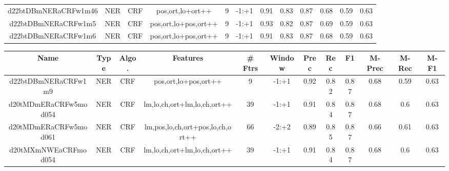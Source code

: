 \documentclass[a4paper]{article}
\begin{document}
\begin{landscape}
\begin{center}
\begin{tabular}{ |c|c|c|c|c|c|c|c|c|c|c|c|}
 
 	
 	\small{ d22btDBmNERaCRFw1m46 } & \small{ NER} & \small{  CRF }  & pos,ort,lo+ort++  &  9 &  \small{  -1:+1 }  &  0.91 & 0.83 & 0.87  &  0.68 & 0.59 & 0.63 \\
 	

 
 	
 	\small{ d22btDBmNERaCRFw1m5 } & \small{ NER} & \small{  CRF }  & pos,ort,lo+pos,ort++  &  9 &  \small{  -1:+1 }  &  0.93 & 0.82 & 0.87  &  0.69 & 0.59 & 0.63 \\
 	

 
 	
 	\small{ d22btDBmNERaCRFw1m6 } & \small{ NER} & \small{  CRF }  & pos,ort,lo+pos,ort++  &  9 &  \small{  -1:+1 }  &  0.91 & 0.83 & 0.87  &  0.68 & 0.59 & 0.63 \\
 	
 \hline
\end{tabular}
\end{center}




\begin{center}
\begin{tabular}{ |c|c|c|c|c|c|c|c|c|c|c|c|} 
 \hline
 	Name & Type & Algo. & Features & \# Ftrs & Window & Prec & Rec & F1 & M-Prec & M-Rec & M-F1\\
 \hline

 	

 
 	
 	\small{ d22btDBmNERaCRFw1m9 } & \small{ NER} & \small{  CRF }  & pos,ort,lo+pos,ort++  &  9 &  \small{  -1:+1 }  &  0.92 & 0.82 & 0.87  &  0.68 & 0.59 & 0.63 \\
 	

 
 	
 	\small{ d20tMDmERaCRFw5mod054 } & \small{ NER} & \small{  CRF }  & lm,lo,ch,ort+lm,lo,ch,ort++  &  39 &  \small{  -1:+1 }  &  0.91 & 0.84 & 0.87  &  0.68 & 0.6 & 0.63 \\
 	

 
 	
 	\small{ d20tMDmERaCRFw5mod061 } & \small{ NER} & \small{  CRF }  & lm,pos,lo,ch,ort+pos,lo,ch,ort++  &  66 &  \small{  -2:+2 }  &  0.89 & 0.85 & 0.87  &  0.66 & 0.61 & 0.63 \\
 	

 
 	
 	\small{ d20tMXmNWEaCRFmod054 } & \small{ NER} & \small{  CRF }  & lm,lo,ch,ort+lm,lo,ch,ort++  &  39 &  \small{  -1:+1 }  &  0.91 & 0.84 & 0.87  &  0.68 & 0.6 & 0.63 \\
 	


\end{tabular}
\end{center}
\end{landscape}
\end{document}
